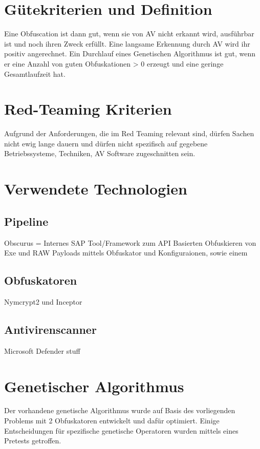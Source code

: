 \section{Gütekriterien und Definition}
Eine Obfuscation ist dann gut, wenn sie von AV nicht erkannt wird, ausführbar ist und noch ihren Zweck erfüllt. Eine langsame Erkennung durch AV wird ihr positiv angerechnet. Ein Durchlauf eines Genetischen Algorithmus ist gut, wenn er eine Anzahl von guten Obfuskationen > 0 erzeugt und eine geringe Gesamtlaufzeit hat.
\section{Red-Teaming Kriterien}
Aufgrund der Anforderungen, die im Red Teaming relevant sind, dürfen Sachen nicht ewig lange dauern und dürfen nicht spezifisch auf gegebene Betriebssysteme, Techniken, AV Software zugeschnitten sein.

\section{Verwendete Technologien}
    \subsection{Pipeline}
    Obscurus = Internes SAP Tool/Framework zum API Basierten Obfuskieren von Exe und RAW Payloads mittels Obfuskator und Konfiguraionen, sowie einem 
    \subsection{Obfuskatoren}
    Nymcrypt2 und Inceptor
    \subsection{Antivirenscanner}
    Microsoft Defender stuff

\section{Genetischer Algorithmus}
Der vorhandene genetische Algorithmus wurde auf Basis des vorliegenden Problems mit 2 Obfuskatoren entwickelt und dafür optimiert. Einige Entscheidungen für spezifische genetische Operatoren wurden mittels eines Pretests getroffen.

